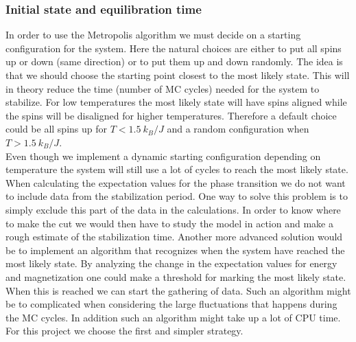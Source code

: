 \documentclass[%
 reprint,
nofootinbib,
aps,
]{revtex4-1}
\begin{document}
\subsubsection{Initial state and equilibration time}
In order to use the Metropolis algorithm we must decide on a starting configuration for the system. Here the natural choices are either to put all spins up or down (same direction) or to put them up and down randomly. The idea is that we should choose the starting point closest to the most likely state. This will in theory reduce the time (number of MC cycles) needed for the system to stabilize. For low temperatures the most likely state will have spins aligned while the spins will be disaligned for higher temperatures. Therefore a default choice could be all spins up for $T < 1.5 \ k_B/J$ and a random configuration when $T > 1.5 \ k_B/J$.\\
Even though we implement a dynamic starting configuration depending on temperature the system will still use a lot of cycles to reach the most likely state. When calculating the expectation values for the phase transition we do not want to include data from the stabilization period. One way to solve this problem is to simply exclude this part of the data in the calculations. In order to know where to make the cut we would then have to study the model in action and make a rough estimate of the stabilization time. Another more advanced solution would be to implement an algorithm that recognizes when the system have reached the most likely state. By analyzing the change in the expectation values for energy and magnetization one could make a threshold for marking the most likely state. When this is reached we can start the gathering of data. Such an algorithm might be to complicated when considering the large fluctuations that happens during the MC cycles. In addition such an algorithm might take up a lot of CPU time. For this project we choose the first and simpler strategy. 
\end{document}
